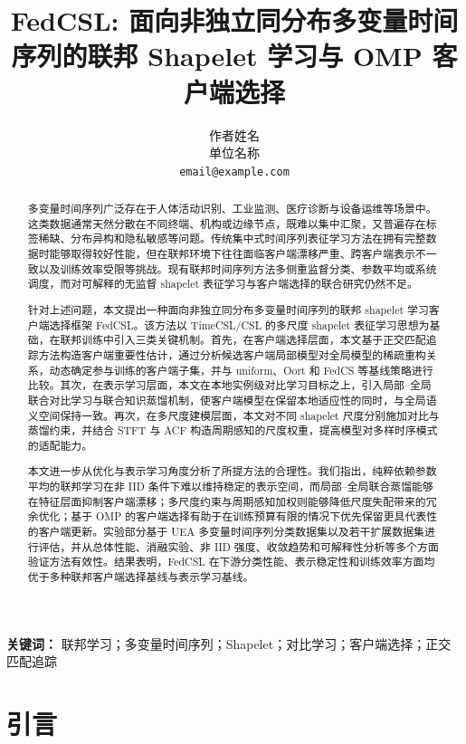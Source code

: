 \documentclass{article}
\title{FedCSL: 面向非独立同分布多变量时间序列的联邦 Shapelet 学习与 OMP 客户端选择}
\author{%
  作者姓名 \\
  单位名称 \\
  \texttt{email@example.com}
}
\begin{document}
\maketitle

\renewcommand{\abstractname}{摘要}

\begin{abstract}
多变量时间序列广泛存在于人体活动识别、工业监测、医疗诊断与设备运维等场景中。这类数据通常天然分散在不同终端、机构或边缘节点，既难以集中汇聚，又普遍存在标签稀缺、分布异构和隐私敏感等问题。传统集中式时间序列表征学习方法在拥有完整数据时能够取得较好性能，但在联邦环境下往往面临客户端漂移严重、跨客户端表示不一致以及训练效率受限等挑战。现有联邦时间序列方法多侧重监督分类、参数平均或系统调度，而对可解释的无监督 shapelet 表征学习与客户端选择的联合研究仍然不足。

针对上述问题，本文提出一种面向非独立同分布多变量时间序列的联邦 shapelet 学习客户端选择框架 FedCSL。该方法以 TimeCSL/CSL 的多尺度 shapelet 表征学习思想为基础，在联邦训练中引入三类关键机制。首先，在客户端选择层面，本文基于正交匹配追踪方法构造客户端重要性估计，通过分析候选客户端局部模型对全局模型的稀疏重构关系，动态确定参与训练的客户端子集，并与 uniform、Oort 和 FedCS 等基线策略进行比较。其次，在表示学习层面，本文在本地实例级对比学习目标之上，引入局部--全局联合对比学习与联合知识蒸馏机制，使客户端模型在保留本地适应性的同时，与全局语义空间保持一致。再次，在多尺度建模层面，本文对不同 shapelet 尺度分别施加对比与蒸馏约束，并结合 STFT 与 ACF 构造周期感知的尺度权重，提高模型对多样时序模式的适配能力。

本文进一步从优化与表示学习角度分析了所提方法的合理性。我们指出，纯粹依赖参数平均的联邦学习在非 IID 条件下难以维持稳定的表示空间，而局部--全局联合蒸馏能够在特征层面抑制客户端漂移；多尺度约束与周期感知加权则能够降低尺度失配带来的冗余优化；基于 OMP 的客户端选择有助于在训练预算有限的情况下优先保留更具代表性的客户端更新。实验部分基于 UEA 多变量时间序列分类数据集以及若干扩展数据集进行评估，并从总体性能、消融实验、非 IID 强度、收敛趋势和可解释性分析等多个方面验证方法有效性。结果表明，FedCSL 在下游分类性能、表示稳定性和训练效率方面均优于多种联邦客户端选择基线与表示学习基线。
\end{abstract}

\noindent\textbf{关键词：} 联邦学习；多变量时间序列；Shapelet；对比学习；客户端选择；正交匹配追踪

\section{引言}
\end{document}
